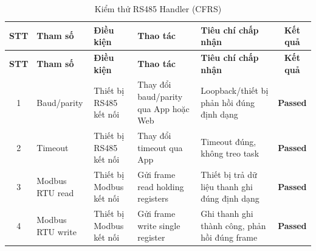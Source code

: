         \begin{longtable}{|c|p{}|p{}|p{}|p{}|c|}
            \caption{Kiểm thử RS485 Handler (CFRS)}
            \label{tab:test_rs485_handler} \\
            \hline
            \textbf{STT} & \textbf{Tham số} & \textbf{Điều kiện} & \textbf{Thao tác} & \textbf{Tiêu chí chấp nhận} & \textbf{Kết quả} \\ \hline
            \endfirsthead
            \hline
            \textbf{STT} & \textbf{Tham số} & \textbf{Điều kiện} & \textbf{Thao tác} & \textbf{Tiêu chí chấp nhận} & \textbf{Kết quả} \\ \hline
            \endhead
            \hline
            \endfoot
            \endlastfoot
        
            1 & Baud/parity & Thiết bị RS485 kết nối & Thay đổi baud/parity qua App hoặc Web & Loopback/thiết bị phản hồi đúng định dạng & \textcolor{modern_blue}{\textbf{Passed}} \\ \hline
            2 & Timeout & Thiết bị RS485 kết nối & Thay đổi timeout qua App & Timeout đúng, không treo task & \textcolor{modern_blue}{\textbf{Passed}} \\ \hline
            3 & Modbus RTU read & Thiết bị Modbus kết nối & Gửi frame read holding registers & Thiết bị trả dữ liệu thanh ghi đúng định dạng & \textcolor{modern_blue}{\textbf{Passed}} \\ \hline
            4 & Modbus RTU write & Thiết bị Modbus kết nối & Gửi frame write single register & Ghi thanh ghi thành công, phản hồi đúng frame & \textcolor{modern_blue}{\textbf{Passed}} \\ \hline
        \end{longtable}
        
